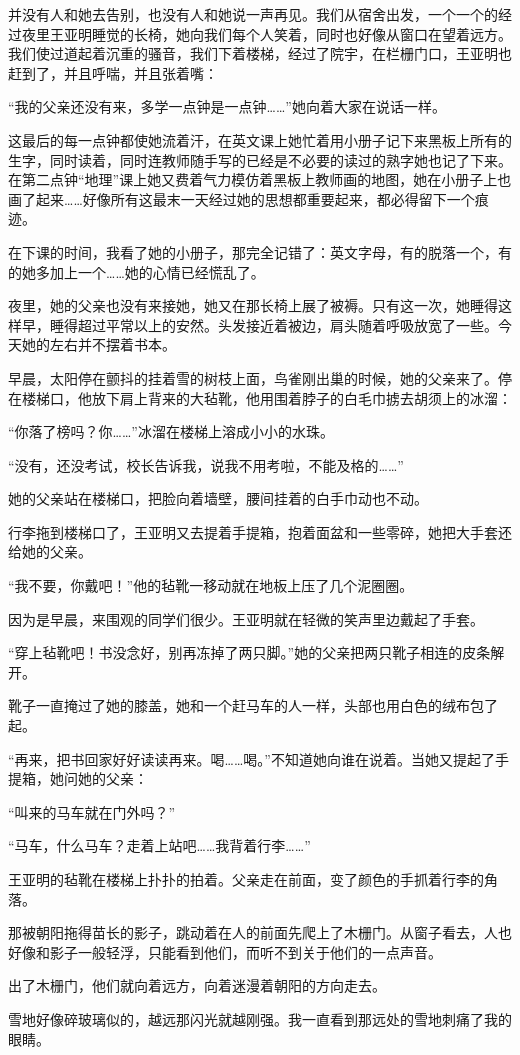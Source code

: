 \par 并没有人和她去告别，也没有人和她说一声再见。我们从宿舍出发，一个一个的经过夜里王亚明睡觉的长椅，她向我们每个人笑着，同时也好像从窗口在望着远方。我们使过道起着沉重的骚音，我们下着楼梯，经过了院宇，在栏栅门口，王亚明也赶到了，并且呼喘，并且张着嘴：
\par “我的父亲还没有来，多学一点钟是一点钟……”她向着大家在说话一样。
\par 这最后的每一点钟都使她流着汗，在英文课上她忙着用小册子记下来黑板上所有的生字，同时读着，同时连教师随手写的已经是不必要的读过的熟字她也记了下来。在第二点钟“地理”课上她又费着气力模仿着黑板上教师画的地图，她在小册子上也画了起来……好像所有这最末一天经过她的思想都重要起来，都必得留下一个痕迹。
\par 在下课的时间，我看了她的小册子，那完全记错了：英文字母，有的脱落一个，有的她多加上一个……她的心情已经慌乱了。
\par 夜里，她的父亲也没有来接她，她又在那长椅上展了被褥。只有这一次，她睡得这样早，睡得超过平常以上的安然。头发接近着被边，肩头随着呼吸放宽了一些。今天她的左右并不摆着书本。
\par 早晨，太阳停在颤抖的挂着雪的树枝上面，鸟雀刚出巢的时候，她的父亲来了。停在楼梯口，他放下肩上背来的大毡靴，他用围着脖子的白毛巾掳去胡须上的冰溜：
\par “你落了榜吗？你……”冰溜在楼梯上溶成小小的水珠。
\par “没有，还没考试，校长告诉我，说我不用考啦，不能及格的……”
\par 她的父亲站在楼梯口，把脸向着墙壁，腰间挂着的白手巾动也不动。
\par 行李拖到楼梯口了，王亚明又去提着手提箱，抱着面盆和一些零碎，她把大手套还给她的父亲。
\par “我不要，你戴吧！”他的毡靴一移动就在地板上压了几个泥圈圈。
\par 因为是早晨，来围观的同学们很少。王亚明就在轻微的笑声里边戴起了手套。
\par “穿上毡靴吧！书没念好，别再冻掉了两只脚。”她的父亲把两只靴子相连的皮条解开。
\par 靴子一直掩过了她的膝盖，她和一个赶马车的人一样，头部也用白色的绒布包了起。
\par “再来，把书回家好好读读再来。喝……喝。”不知道她向谁在说着。当她又提起了手提箱，她问她的父亲：
\par “叫来的马车就在门外吗？”
\par “马车，什么马车？走着上站吧……我背着行李……”
\par 王亚明的毡靴在楼梯上扑扑的拍着。父亲走在前面，变了颜色的手抓着行李的角落。
\par 那被朝阳拖得苗长的影子，跳动着在人的前面先爬上了木栅门。从窗子看去，人也好像和影子一般轻浮，只能看到他们，而听不到关于他们的一点声音。
\par 出了木栅门，他们就向着远方，向着迷漫着朝阳的方向走去。
\par 雪地好像碎玻璃似的，越远那闪光就越刚强。我一直看到那远处的雪地刺痛了我的眼睛。
\par {}
\par {}

